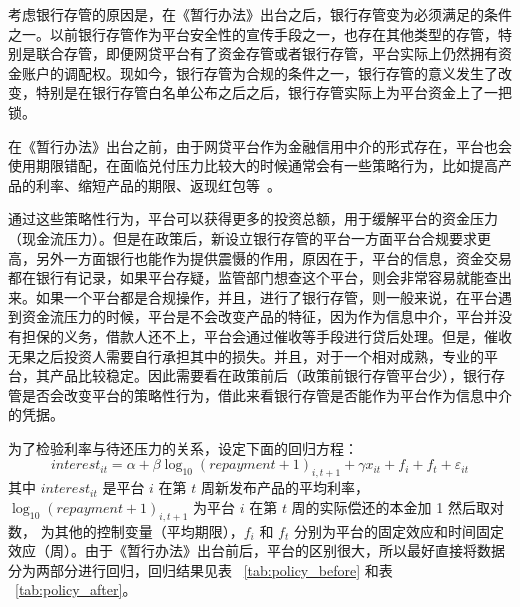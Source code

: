 \documentclass[lang=cn,11pt]{elegantpaper}
\begin{document}
考虑银行存管的原因是，在《暂行办法》出台之后，银行存管变为必须满足的条件之一。以前银行存管作为平台安全性的宣传手段之一，也存在其他类型的存管，特别是联合存管，即便网贷平台有了资金存管或者银行存管，平台实际上仍然拥有资金账户的调配权。现如今，银行存管为合规的条件之一，银行存管的意义发生了改变，特别是在银行存管白名单公布之后之后，银行存管实际上为平台资金上了一把锁。

在《暂行办法》出台之前，由于网贷平台作为金融信用中介的形式存在，平台也会使用期限错配，在面临兑付压力比较大的时候通常会有一些策略行为，比如提高产品的利率、缩短产品的期限、返现红包等~\citep{ddscz2019}。

通过这些策略性行为，平台可以获得更多的投资总额，用于缓解平台的资金压力（现金流压力）。但是在政策后，新设立银行存管的平台一方面平台合规要求更高，另外一方面银行也能作为提供震慑的作用，原因在于，平台的信息，资金交易都在银行有记录，如果平台存疑，监管部门想查这个平台，则会非常容易就能查出来。如果一个平台都是合规操作，并且，进行了银行存管，则一般来说，在平台遇到资金流压力的时候，平台是不会改变产品的特征，因为作为信息中介，平台并没有担保的义务，借款人还不上，平台会通过催收等手段进行贷后处理。但是，催收无果之后投资人需要自行承担其中的损失。并且，对于一个相对成熟，专业的平台，其产品比较稳定。因此需要看在政策前后（政策前银行存管平台少），银行存管是否会改变平台的策略性行为，借此来看银行存管是否能作为平台作为信息中介的凭据。

为了检验利率与待还压力的关系，设定下面的回归方程：
\begin{equation}
interest_{it} = \alpha + \beta \log_{10}(repayment + 1)_{i,t+1} + \gamma x_{it} + f_{i} + f_{t} + \varepsilon_{it}
\end{equation}
其中 $interest_{it}$ 是平台 $i$ 在第 $t$ 周新发布产品的平均利率，$\log_{10}(repayment + 1)_{i,t+1}$ 为平台 $i$ 在第 $t$ 周的实际偿还的本金加 1 然后取对数， 为其他的控制变量（平均期限），$f_i$ 和 $f_t$ 分别为平台的固定效应和时间固定效应（周）。由于《暂行办法》出台前后，平台的区别很大，所以最好直接将数据分为两部分进行回归，回归结果见表 ~\ref{tab:policy_before} 和表 ~\ref{tab:policy_after}。 
\end{document}
